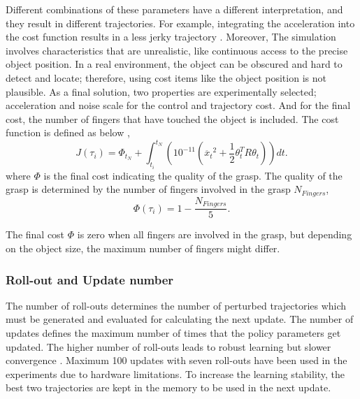 \documentclass[letterpaper, 10 pt, conference]{ieeeconf}  %
\begin{document}
\noindent
Different combinations of these parameters have a different interpretation, and they result in different trajectories. For example, integrating the acceleration into the cost function results in a less jerky trajectory \cite{freekpi2}.
Moreover, The simulation involves characteristics that are unrealistic, like continuous access to the precise object position. In a real environment, the object can be obscured and hard to detect and locate; therefore, using cost items like the object position is not plausible. As a final solution, two properties are experimentally selected; acceleration and noise scale for the control and trajectory cost. And for the final cost, the number of fingers that have touched the object is included. 
The cost function is defined as below \cite{freekpi2},
\begin{equation}
    J(\tau_i) = \Phi_{t_{N}} + \int_{t_i}^{t_N} (10^{-11}(\ddot{x_t}^2 + \frac{1}{2} \theta_t^T R\theta_t)) dt.
\end{equation}
where $\Phi$ is the final cost indicating the quality of the grasp. The quality of the grasp is determined by the number of fingers involved in the grasp $N_{Fingers}$,
\begin{equation}
    \Phi(\tau_i) = 1 - \frac{ N_{Fingers} }{ 5 }.
\end{equation}

\noindent
The final cost $\Phi$ is zero when all fingers are involved in the grasp, but depending on the object size, the maximum number of fingers might differ.

\subsubsection{Roll-out and Update number}
The number of roll-outs determines the number of perturbed trajectories which must be generated and evaluated for calculating the next update. The number of updates defines the maximum number of times that the policy parameters get updated.
The higher number of roll-outs leads to robust learning but slower convergence \cite{freekpi2}. Maximum 100 updates with seven roll-outs have been used in the experiments due to hardware limitations. To increase the learning stability, the best two trajectories are kept in the memory to be used in the next update.
\end{document}
